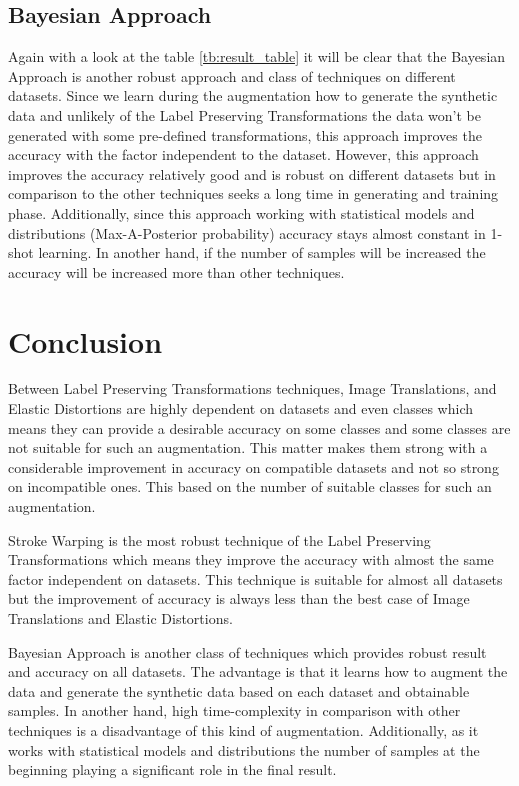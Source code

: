 \subsection{Bayesian Approach}
Again with a look at the table \ref{tb:result_table}  it will be clear that the Bayesian Approach is
another robust approach and class of techniques on different datasets. Since we learn during the
augmentation how to generate the synthetic data and unlikely of the Label Preserving Transformations
the data won't be generated with some pre-defined transformations, this approach improves the
accuracy with the factor independent to the dataset. However, this approach improves the accuracy
relatively good and is robust on different datasets but in comparison to the other techniques seeks
a long time in generating and training phase. Additionally, since this approach working with
statistical models and distributions (Max-A-Posterior probability) accuracy stays almost constant in
1-shot learning. In another hand, if the number of samples will be increased the accuracy will be
increased more than other techniques.

\section{Conclusion}
Between Label Preserving Transformations techniques, Image Translations, and Elastic Distortions are highly dependent on datasets and even classes which means they can provide a desirable accuracy on some classes and some classes are not suitable for such an augmentation. This matter makes them strong with a considerable improvement in accuracy on compatible datasets and not so strong on incompatible ones. This based on the number of suitable classes for such an augmentation.

Stroke Warping is the most robust technique of the Label Preserving Transformations which means they improve the accuracy with almost the same factor independent on datasets. This technique is suitable for almost all datasets but the improvement of accuracy is always less than the best case of Image Translations and Elastic Distortions.

Bayesian Approach is another class of techniques which provides robust result and accuracy on all datasets. The advantage is that it learns how to augment the data and generate the synthetic data based on each dataset and obtainable samples. In another hand, high time-complexity in comparison with other techniques is a disadvantage of this kind of augmentation. Additionally, as it works with statistical models and distributions the number of samples at the beginning playing a significant role in the final result.

